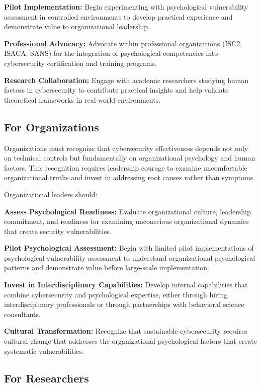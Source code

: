 \documentclass[10pt, twocolumn]{article}
\begin{document}
\textbf{Pilot Implementation:} Begin experimenting with psychological vulnerability assessment in controlled environments to develop practical experience and demonstrate value to organizational leadership.

\textbf{Professional Advocacy:} Advocate within professional organizations (ISC2, ISACA, SANS) for the integration of psychological competencies into cybersecurity certification and training programs.

\textbf{Research Collaboration:} Engage with academic researchers studying human factors in cybersecurity to contribute practical insights and help validate theoretical frameworks in real-world environments.

\subsection{For Organizations}

Organizations must recognize that cybersecurity effectiveness depends not only on technical controls but fundamentally on organizational psychology and human factors. This recognition requires leadership courage to examine uncomfortable organizational truths and invest in addressing root causes rather than symptoms.

Organizational leaders should:

\textbf{Assess Psychological Readiness:} Evaluate organizational culture, leadership commitment, and readiness for examining unconscious organizational dynamics that create security vulnerabilities.

\textbf{Pilot Psychological Assessment:} Begin with limited pilot implementations of psychological vulnerability assessment to understand organizational psychological patterns and demonstrate value before large-scale implementation.

\textbf{Invest in Interdisciplinary Capabilities:} Develop internal capabilities that combine cybersecurity and psychological expertise, either through hiring interdisciplinary professionals or through partnerships with behavioral science consultants.

\textbf{Cultural Transformation:} Recognize that sustainable cybersecurity requires cultural change that addresses the organizational psychological factors that create systematic vulnerabilities.

\subsection{For Researchers}
\end{document}
